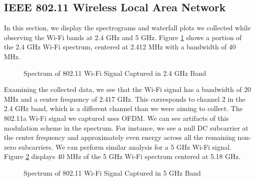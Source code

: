 \documentclass{article}
\begin{document}
\subsection{IEEE 802.11 Wireless Local Area Network}

In this section, we display the spectrograms and waterfall plots we collected while observing the Wi-Fi bands at 2.4 GHz and 5 GHz. Figure \ref{fig::2_412_wifi_spectrum} shows a portion of the 2.4 GHz Wi-Fi spectrum, centered at 2.412 MHz with a bandwidth of 40 MHz.

\begin{figure}[H]
	\centerline{}
	\caption{Spectrum of 802.11 Wi-Fi Signal Captured in 2.4 GHz Band}
	\label{fig::2_412_wifi_spectrum}
\end{figure}

Examining the collected data, we see that the Wi-Fi signal has a bandwidth of 20 MHz and a center frequency of 2.417 GHz. This corresponds to channel 2 in the 2.4 GHz band, which is a different channel than we were aiming to collect. The 802.11a Wi-Fi signal we captured uses OFDM. We can see artifacts of this modulation scheme in the spectrum. For instance, we see a null DC subcarrier at the center frequency and approximately even energy across all the remaining non-zero subcarriers. We can perform similar analysis for a 5 GHz Wi-Fi signal. Figure \ref{fig::5_180g_wifi_spectrum} displays 40 MHz of the 5 GHz Wi-Fi spectrum centered at 5.18 GHz.

\begin{figure}[H]
	\centerline{}
	\caption{Spectrum of 802.11 Wi-Fi Signal Captured in 5 GHz Band}
	\label{fig::5_180g_wifi_spectrum}
\end{figure}
\end{document}
